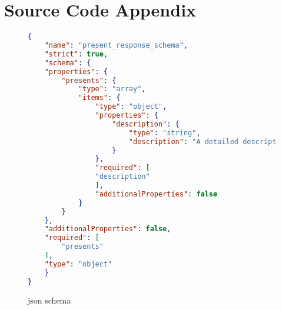 \chapter{Source Code Appendix}


\begin{figure}[!ht]
    \begin{lstlisting}[language=json]
{
    "name": "present_response_schema",
    "strict": true,
    "schema": {
    "properties": {
        "presents": {
            "type": "array",
            "items": {
                "type": "object",
                "properties": {
                    "description": {
                        "type": "string",
                        "description": "A detailed description of the present."
                    }
                },
                "required": [
                "description"
                ],
                "additionalProperties": false
            }
        }
    },
    "additionalProperties": false,
    "required": [
        "presents"
    ],
    "type": "object"
    }
}
    \end{lstlisting}
    \caption{json schema}
    \label{fig:jsonschema}
\end{figure}